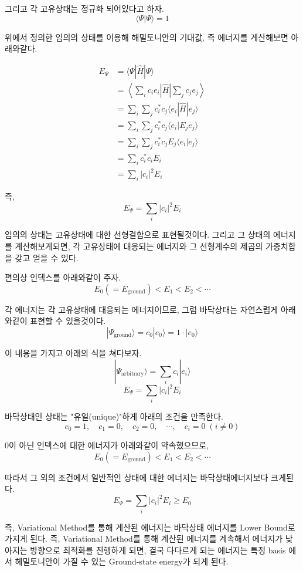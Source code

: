 \documentclass[11pt]{article}
\begin{document}
\begin{enumerate}[label=2)]
\begin{enumerate}[label=*]
\begin{mdframed}
그리고 각 고유상태는 정규화 되어있다고 하자.
\[
\langle \Psi | \Psi \rangle = 1
\]


위에서 정의한 임의의 상태를 이용해 해밀토니안의 기대값, 즉 에너지를 계산해보면 아래와같다.

\begin{align*}
E_\Psi &= \langle \Psi | \hat{H} | \Psi \rangle \\
&= \left\langle \sum_i c_i e_i \left| \hat{H} \right| \sum_j c_j e_j \right\rangle \\
&= \sum_{i} \sum_{j} c_i^* c_j \langle e_i | \hat{H} | e_j \rangle \\
&= \sum_{i} \sum_{j} c_i^* c_j \langle e_i | E_j e_j \rangle \\
&= \sum_{i} \sum_{j} c_i^* c_j E_j \langle e_i | e_j \rangle \\
&= \sum_{i} c_i^* c_i E_i \\
&= \sum_{i} |c_i|^2 E_i \tag{2}
\end{align*}

즉,
\[
E_\Psi = \sum_{i} |c_i|^2 E_i
\]

임의의 상태는 고유상태에 대한 선형결합으로 표현될것이다. 그리고 그 상태의 에너지를 계산해보게되면, 각 고유상태에 대응되는 에너지와 그 선형계수의 제곱의 가중치합을 갖고 얻을 수 있다.

편의상 인덱스를 아래와같이 주자.
\[
E_0 (= E_{\text{ground}}) < E_1 < E_2 < \cdots
\]

각 에너지는 각 고유상태에 대응되는 에너지이므로, 그럼 바닥상태는 자연스럽게 아래와같이 표현할 수 있을것이다.
\[
|\Psi_{\text{ground}}\rangle = c_0 | e_0 \rangle = 1 \cdot | e_0 \rangle
\]

이 내용을 가지고 아래의 식을 쳐다보자.
\[
|\Psi_{\text{arbitrary}}\rangle = \sum_i c_i | e_i \rangle
\]
\[
E_\Psi = \sum_{i} |c_i|^2 E_i
\]

바닥상태인 상태는 "유일(unique)"하게 아래의 조건을 만족한다.
\[
c_0=1, \quad c_1=0, \quad c_2=0, \quad \cdots, \quad c_i=0 \; (i \neq 0)
\]

0이 아닌 인덱스에 대한 에너지가 아래와같이 약속했으므로,
\[
E_0 (= E_{\text{ground}}) < E_1 < E_2 < \cdots
\]

따라서 그 외의 조건에서 일반적인 상태에 대한 에너지는 바닥상태에너지보다 크게된다.
\[
E_\Psi = \sum_i |c_i|^2 E_i \ge E_0
\]
\end{mdframed}
즉, Variational Method를 통해 계산된 에너지는 바닥상태 에너지를 Lower Bound로 가지게 된다. 
즉, Variational Method를 통해 계산된 에너지를 계속해서 에너지가 낮아지는 방향으로 최적화를 진행하게 되면, 결국 다다르게 되는 에너지는 특정 basis 에서 헤밀토니안이 가질 수 있는 Ground-state energy가 되게 된다. 


\end{enumerate}
\end{enumerate}
\end{document}
